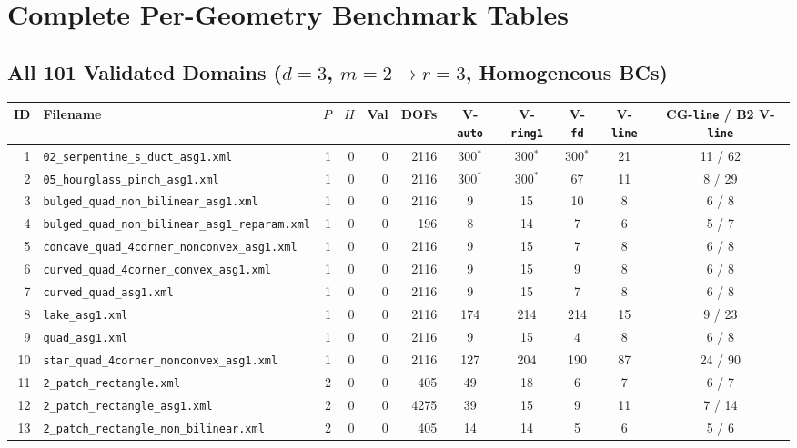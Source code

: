 \documentclass[10pt,a4paper]{article}
\begin{document}
\section{Complete Per-Geometry Benchmark Tables}

\subsection{All 101 Validated Domains ($d=3$, $m=2\to r=3$, Homogeneous BCs)}
{\tiny
\setlength{\tabcolsep}{2.5pt}
\begin{longtable}{@{}rlrrrrccccc@{}}
\toprule
\textbf{ID} & \textbf{Filename} & $P$ & $H$ & \textbf{Val} & \textbf{DOFs} & \textbf{V-\texttt{auto}} & \textbf{V-\texttt{ring1}} & \textbf{V-\texttt{fd}} & \textbf{V-\texttt{line}} & \textbf{CG-\texttt{line}} / \textbf{B2 V-\texttt{line}} \\
\midrule
\endhead
1 & \texttt{02\_serpentine\_s\_duct\_asg1.xml} & 1 & 0 & 0 & 2116 & 300$^*$ & 300$^*$ & 300$^*$ & 21 & 11 / 62 \\
2 & \texttt{05\_hourglass\_pinch\_asg1.xml} & 1 & 0 & 0 & 2116 & 300$^*$ & 300$^*$ & 67 & 11 & 8 / 29 \\
3 & \texttt{bulged\_quad\_non\_bilinear\_asg1.xml} & 1 & 0 & 0 & 2116 & 9 & 15 & 10 & 8 & 6 / 8 \\
4 & \texttt{bulged\_quad\_non\_bilinear\_asg1\_reparam.xml} & 1 & 0 & 0 & 196 & 8 & 14 & 7 & 6 & 5 / 7 \\
5 & \texttt{concave\_quad\_4corner\_nonconvex\_asg1.xml} & 1 & 0 & 0 & 2116 & 9 & 15 & 7 & 8 & 6 / 8 \\
6 & \texttt{curved\_quad\_4corner\_convex\_asg1.xml} & 1 & 0 & 0 & 2116 & 9 & 15 & 9 & 8 & 6 / 8 \\
7 & \texttt{curved\_quad\_asg1.xml} & 1 & 0 & 0 & 2116 & 9 & 15 & 7 & 8 & 6 / 8 \\
8 & \texttt{lake\_asg1.xml} & 1 & 0 & 0 & 2116 & 174 & 214 & 214 & 15 & 9 / 23 \\
9 & \texttt{quad\_asg1.xml} & 1 & 0 & 0 & 2116 & 9 & 15 & 4 & 8 & 6 / 8 \\
10 & \texttt{star\_quad\_4corner\_nonconvex\_asg1.xml} & 1 & 0 & 0 & 2116 & 127 & 204 & 190 & 87 & 24 / 90 \\
11 & \texttt{2\_patch\_rectangle.xml} & 2 & 0 & 0 & 405 & 49 & 18 & 6 & 7 & 6 / 7 \\
12 & \texttt{2\_patch\_rectangle\_asg1.xml} & 2 & 0 & 0 & 4275 & 39 & 15 & 9 & 11 & 7 / 14 \\
13 & \texttt{2\_patch\_rectangle\_non\_bilinear.xml} & 2 & 0 & 0 & 405 & 14 & 14 & 5 & 6 & 5 / 6 \\

\end{longtable}}
\end{document}
